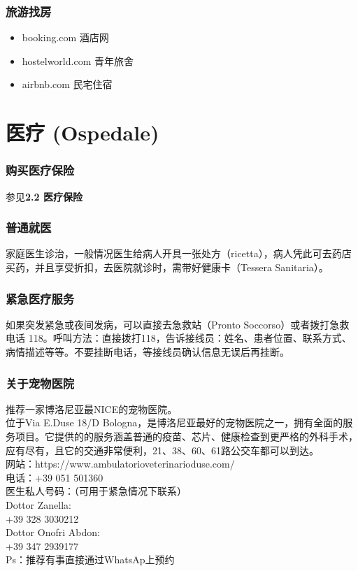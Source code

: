 \subsubsection{旅游找房}
\begin{itemize}
\item booking.com 酒店网
\item hostelworld.com 青年旅舍
\item airbnb.com 民宅住宿
\end{itemize} 


\section{医疗 (Ospedale)}


\subsubsection{购买医疗保险}
参见\textbf{2.2 医疗保险} 

\subsubsection{普通就医}
家庭医生诊治，一般情况医生给病人开具一张处方（ricetta），病人凭此可去药店买药，并且享受折扣，去医院就诊时，需带好健康卡（Tessera Sanitaria）。
\subsubsection{紧急医疗服务}

如果突发紧急或夜间发病，可以直接去急救站（Pronto Soccorso）或者拨打急救电话 118。呼叫方法：直接拨打118，告诉接线员：姓名、患者位置、联系方式、病情描述等等。不要挂断电话，等接线员确认信息无误后再挂断。
\subsubsection{关于宠物医院}
推荐一家博洛尼亚最NICE的宠物医院。\\
位于Via E.Duse 18/D Bologna，是博洛尼亚最好的宠物医院之一，拥有全面的服务项目。它提供的的服务涵盖普通的疫苗、芯片、健康检查到更严格的外科手术，应有尽有，且它的交通非常便利，21、38、60、61路公交车都可以到达。\\
网站：https://www.ambulatorioveterinarioduse.com/\\
电话：+39 051 501360\\
医生私人号码：（可用于紧急情况下联系）\\
Dottor Zanella:\\
+39 328 3030212\\
Dottor Onofri Abdon:\\
+39 347 2939177\\
Ps：推荐有事直接通过WhatsAp上预约\\
\\
\\
